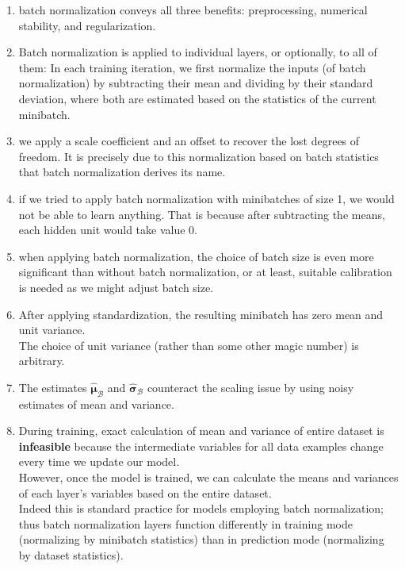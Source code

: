 \begin{enumerate}[itemsep=0.1cm]
    \item batch normalization conveys all three benefits: preprocessing, numerical stability, and regularization.

    \item Batch normalization is applied to individual layers, or optionally, to all of them: In each training iteration, we first normalize the inputs (of batch normalization) by subtracting their mean and dividing by their standard deviation, where both are estimated based on the statistics of the current minibatch.

    \item we apply a scale coefficient and an offset to recover the lost degrees of freedom. It is precisely due to this normalization based on batch statistics that batch normalization derives its name.

    \item if we tried to apply batch normalization with minibatches of size 1, we would not be able to learn anything. That is because after subtracting the means, each hidden unit would take value 0.

    \item when applying batch normalization, the choice of batch size is even more significant than without batch normalization, or at least, suitable calibration is needed as we might adjust batch size.

    \item After applying standardization, the resulting minibatch has zero mean and unit variance.\\
    The choice of unit variance (rather than some other magic number) is arbitrary.

    \item The estimates $\hat{\boldsymbol{\mu}}_\mathcal{B}$ and ${\hat{\boldsymbol{\sigma}}_\mathcal{B}}$ counteract the scaling issue by using noisy estimates of mean and variance.

    \item During training, exact calculation of mean and variance of entire dataset is \textbf{infeasible} because the intermediate variables for all data examples change every time we update our model.\\
    However, once the model is trained, we can calculate the means and variances of each layer’s variables based on the entire dataset.\\
    Indeed this is standard practice for models employing batch normalization; thus batch normalization layers function differently in training mode (normalizing by minibatch statistics) than in prediction mode (normalizing by dataset statistics).


\end{enumerate}
